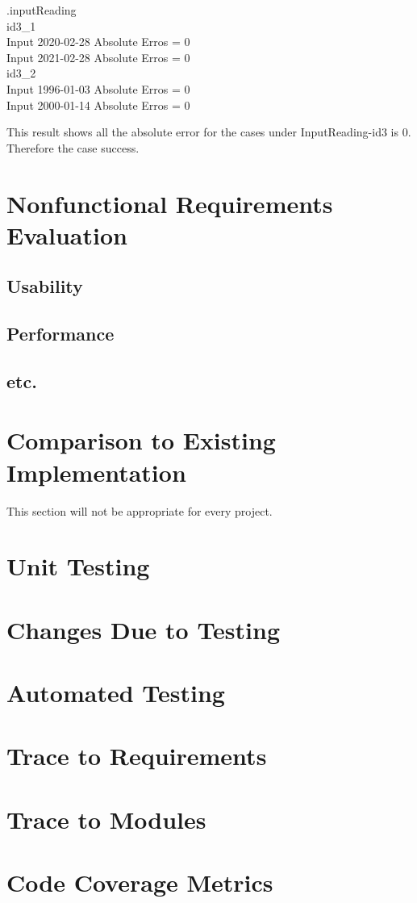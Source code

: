 \documentclass[12pt, titlepage]{article}
\begin{document}
\begin{enumerate}
\begin{center}
.inputReading\\
id3\_1\\
Input 2020-02-28 Absolute Erros = 0\\
Input 2021-02-28 Absolute Erros = 0\\
id3\_2\\
Input 1996-01-03 Absolute Erros = 0\\
Input 2000-01-14 Absolute Erros = 0\\
\end{center}

This result shows all the absolute error for the cases under InputReading-id3 is 0. Therefore the case success.

\end{enumerate}
\section{Nonfunctional Requirements Evaluation}

\subsection{Usability}
		
\subsection{Performance}

\subsection{etc.}
	
\section{Comparison to Existing Implementation}	

This section will not be appropriate for every project.

\section{Unit Testing}

\section{Changes Due to Testing}

\section{Automated Testing}
		
\section{Trace to Requirements}
		
\section{Trace to Modules}		

\section{Code Coverage Metrics}


 
%
\end{document}
